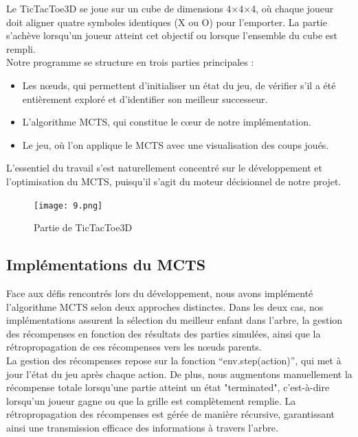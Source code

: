 \documentclass{article}
\begin{document}
Le TicTacToe3D se joue sur un cube de dimensions 4×4×4, où chaque joueur doit aligner quatre symboles identiques (X ou O) pour l'emporter. La partie s'achève lorsqu'un joueur atteint cet objectif ou lorsque l'ensemble du cube est rempli.\\

Notre programme se structure en trois parties principales :
\begin{itemize} 
    \item Les nœuds, qui permettent d'initialiser un état du jeu, de vérifier s'il a été entièrement exploré et d'identifier son meilleur successeur.
    \item L'algorithme MCTS, qui constitue le cœur de notre implémentation.
    \item Le jeu, où l'on applique le MCTS avec une visualisation des coups joués.
\end{itemize}

\quad L'essentiel du travail s'est naturellement concentré sur le développement et l'optimisation du MCTS, puisqu'il s'agit du moteur décisionnel de notre projet.

\begin{figure}[ht]
    \centering
    \texttt{[image: 9.png]}
    \caption{Partie de TicTacToe3D}
\end{figure}

\subsection{Implémentations du MCTS}

\quad Face aux défis rencontrés lors du développement, nous avons implémenté l’algorithme MCTS selon deux approches distinctes. Dans les deux cas, nos implémentations assurent la sélection du meilleur enfant dans l’arbre, la gestion des récompenses en fonction des résultats des parties simulées, ainsi que la rétropropagation de ces récompenses vers les nœuds parents.\\

La gestion des récompenses repose sur la fonction “env.step(action)”, qui met à jour l'état du jeu après chaque action. De plus, nous augmentons manuellement la récompense totale lorsqu’une partie atteint un état "terminated", c’est-à-dire lorsqu’un joueur gagne ou que la grille est complètement remplie. La rétropropagation des récompenses est gérée de manière récursive, garantissant ainsi une transmission efficace des informations à travers l’arbre.\\
\end{document}
